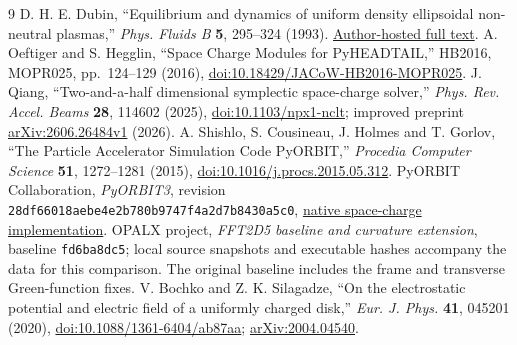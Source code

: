 \begin{thebibliography}{9}
D. H. E. Dubin, ``Equilibrium and dynamics of uniform density ellipsoidal
non-neutral plasmas,'' \emph{Phys. Fluids B} \textbf{5}, 295--324 (1993).
\href{https://nnp.ucsd.edu/pdf_files/PFB_5_295_1993.PDF}{Author-hosted full text}.
A. Oeftiger and S. Hegglin, ``Space Charge Modules for PyHEADTAIL,''
HB2016, MOPR025, pp.~124--129 (2016),
\href{https://doi.org/10.18429/JACoW-HB2016-MOPR025}{doi:10.18429/JACoW-HB2016-MOPR025}.
J. Qiang, ``Two-and-a-half dimensional symplectic space-charge solver,''
\emph{Phys. Rev. Accel. Beams} \textbf{28}, 114602 (2025),
\href{https://doi.org/10.1103/npx1-nclt}{doi:10.1103/npx1-nclt};
improved preprint \href{https://arxiv.org/abs/2606.26484v1}{arXiv:2606.26484v1} (2026).
A. Shishlo, S. Cousineau, J. Holmes and T. Gorlov,
``The Particle Accelerator Simulation Code PyORBIT,''
\emph{Procedia Computer Science} \textbf{51}, 1272--1281 (2015),
\href{https://doi.org/10.1016/j.procs.2015.05.312}{doi:10.1016/j.procs.2015.05.312}.
PyORBIT Collaboration, \emph{PyORBIT3}, revision
\texttt{28df66018aebe4e2b780b9747f4a2d7b8430a5c0},
\href{https://github.com/PyORBIT-Collaboration/PyORBIT3/tree/28df66018aebe4e2b780b9747f4a2d7b8430a5c0/src/spacecharge}{native space-charge implementation}.
OPALX project, \emph{FFT2D5 baseline and curvature extension}, baseline
\texttt{fd6ba8dc5}; local source snapshots and executable hashes accompany
the data for this comparison. The original baseline includes the frame and
transverse Green-function fixes.
V. Bochko and Z. K. Silagadze, ``On the electrostatic potential and electric
field of a uniformly charged disk,'' \emph{Eur. J. Phys.} \textbf{41}, 045201
(2020), \href{https://doi.org/10.1088/1361-6404/ab87aa}{doi:10.1088/1361-6404/ab87aa};
\href{https://arxiv.org/abs/2004.04540}{arXiv:2004.04540}.
\end{thebibliography}
